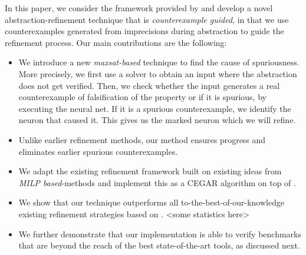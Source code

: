 In this paper, we consider the framework provided by \deeppoly{} and develop a novel abstraction-refinement technique that is {\em counterexample guided}, in that we use counterexamples generated from imprecisions during abstraction to guide the refinement process. Our main contributions are the following:
\begin{itemize}
\item We introduce a new {\em maxsat-based} technique to find the cause of spuriousness. More precisely, we first use a \milp{} solver to obtain an input where the abstraction does not get verified. Then, we check whether the input generates a real counterexample of falsification of the property or if it is spurious, by executing the neural net. If it is a spurious counterexample, we identify the neuron that caused it.  This gives us the marked neuron which we will refine.
\item Unlike earlier refinement methods, our method ensures progress and eliminates
  earlier spurious counterexamples.
\item We adapt the existing refinement framework built on existing ideas from {\em MILP based}-methods and implement this as a CEGAR algorithm on top of \deeppoly{}.
\item We show that our technique outperforms all to-the-best-of-our-knowledge existing refinement strategies based on \deeppoly{}. <some statistics  here>
\item We further demonstrate that our implementation is able to verify benchmarks that are beyond the reach of the best state-of-the-art tools, as discussed next.
\end{itemize}




